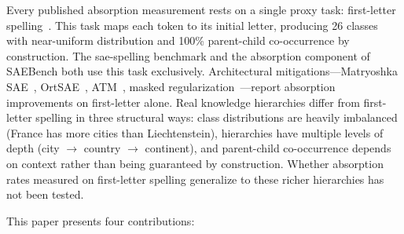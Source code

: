 \documentclass{article}
\begin{document}
Every published absorption measurement rests on a single proxy task: first-letter spelling~\citep{chanin2024absorption, karvonen2025saebench}. This task maps each token to its initial letter, producing 26 classes with near-uniform distribution and 100\% parent-child co-occurrence by construction. The sae-spelling benchmark and the absorption component of SAEBench both use this task exclusively. Architectural mitigations---Matryoshka SAE~\citep{bussmann2025matryoshka}, OrtSAE~\citep{korznikov2025ortsae}, ATM~\citep{li2025atm}, masked regularization~\citep{narayanaswamy2026masked}---report absorption improvements on first-letter alone. Real knowledge hierarchies differ from first-letter spelling in three structural ways: class distributions are heavily imbalanced (France has more cities than Liechtenstein), hierarchies have multiple levels of depth (city $\to$ country $\to$ continent), and parent-child co-occurrence depends on context rather than being guaranteed by construction. Whether absorption rates measured on first-letter spelling generalize to these richer hierarchies has not been tested.

This paper presents four contributions:
\end{document}

